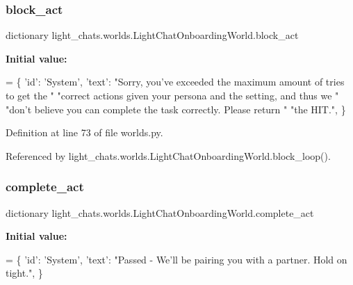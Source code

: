 \subsubsection{\texorpdfstring{block\+\_\+act}{block\_act}}
{\footnotesize\ttfamily dictionary light\+\_\+chats.\+worlds.\+Light\+Chat\+Onboarding\+World.\+block\+\_\+act\hspace{0.3cm}{\ttfamily [static]}}

{\bfseries Initial value\+:}
\begin{DoxyCode}
=  \{
        \textcolor{stringliteral}{'id'}: \textcolor{stringliteral}{'System'},
        \textcolor{stringliteral}{'text'}: \textcolor{stringliteral}{"Sorry, you've exceeded the maximum amount of tries to get the "}
        \textcolor{stringliteral}{"correct actions given your persona and the setting, and thus we "}
        \textcolor{stringliteral}{"don't believe you can complete the task correctly. Please return "}
        \textcolor{stringliteral}{"the HIT."},
    \}
\end{DoxyCode}


Definition at line 73 of file worlds.\+py.



Referenced by light\+\_\+chats.\+worlds.\+Light\+Chat\+Onboarding\+World.\+block\+\_\+loop().

\mbox{\label{classlight__chats_1_1worlds_1_1LightChatOnboardingWorld_a8a829ffc9441313b2934f656f8632fc7}} 
\subsubsection{\texorpdfstring{complete\+\_\+act}{complete\_act}}
{\footnotesize\ttfamily dictionary light\+\_\+chats.\+worlds.\+Light\+Chat\+Onboarding\+World.\+complete\+\_\+act\hspace{0.3cm}{\ttfamily [static]}}

{\bfseries Initial value\+:}
\begin{DoxyCode}
=  \{
        \textcolor{stringliteral}{'id'}: \textcolor{stringliteral}{'System'},
        \textcolor{stringliteral}{'text'}: \textcolor{stringliteral}{"Passed - We'll be pairing you with a partner. Hold on tight."},
    \}
\end{DoxyCode}


